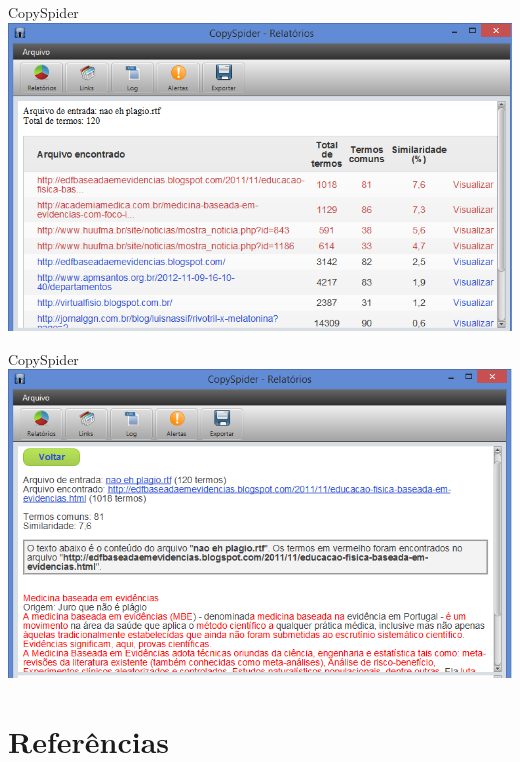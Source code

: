\documentclass{beamer}
\begin{document}
\begin{frame}{CopySpider}
  \includegraphics[width=\textwidth]{Referencias/copyspider3}
\end{frame}

\begin{frame}{CopySpider}
  \includegraphics[width=\textwidth]{Referencias/copyspider4}
\end{frame}

\section{Referências}
\end{document}
